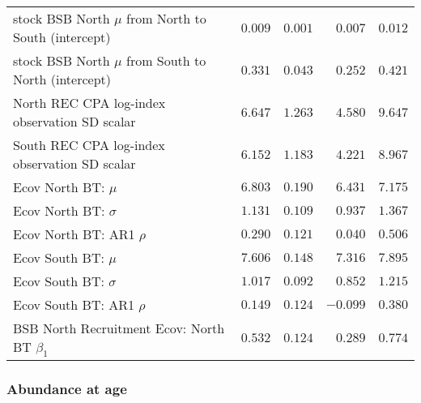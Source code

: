 \documentclass[
]{article}
\begin{document}
\begin{landscape}
\begin{longtable}[t]{lrrrr}
stock BSB North $\mu$ from North to South (intercept) & $0.009$ & $0.001$ & $0.007$ & $0.012$\\
stock BSB North $\mu$ from South to North (intercept) & $0.331$ & $0.043$ & $0.252$ & $0.421$\\
North REC CPA log-index observation SD scalar & $6.647$ & $1.263$ & $4.580$ & $9.647$\\
South REC CPA log-index observation SD scalar & $6.152$ & $1.183$ & $4.221$ & $8.967$\\
\addlinespace
Ecov North BT: $\mu$ & $6.803$ & $0.190$ & $6.431$ & $7.175$\\
Ecov North BT: $\sigma$ & $1.131$ & $0.109$ & $0.937$ & $1.367$\\
Ecov North BT: AR1 $\rho$ & $0.290$ & $0.121$ & $0.040$ & $0.506$\\
Ecov South BT: $\mu$ & $7.606$ & $0.148$ & $7.316$ & $7.895$\\
Ecov South BT: $\sigma$ & $1.017$ & $0.092$ & $0.852$ & $1.215$\\
\addlinespace
Ecov South BT: AR1 $\rho$ & $0.149$ & $0.124$ & $-0.099$ & $0.380$\\
BSB North Recruitment Ecov: North BT $\beta_1$ & $0.532$ & $0.124$ & $0.289$ & $0.774$\\*
\end{longtable}
\end{landscape}

\hypertarget{abundance-at-age}{%
\subsubsection{Abundance at age}\label{abundance-at-age}}
\end{document}
